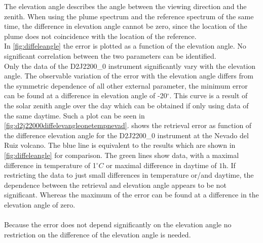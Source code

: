The elevation angle describes the angle between the viewing direction and the zenith. When using the plume spectrum and the reference spectrum of the same time, the difference in elevation angle cannot be zero, since the location of the plume does not coincidence with the location of the reference.\\
In \cref{fig:diffeleangle} the  error is plotted as a function of the elevation angle. No significant correlation between the two parameters can be identified. \\
Only the data of the D2J2200\_0 instrument significantly vary with the elevation angle. The observable variation of the  error with the elevation angle differs from the symmetric dependence of all other external parameter, the minimum  error can be found at a difference in elevation angle of -20$^{\circ}$. This curve is a result of the solar zenith angle over the day which can be obtained if only using data of the same daytime. Such a plot can be seen in \cref{fig:d2j22000diffelevangleonetempnevad}.
 shows the  retrieval error as function of the difference elevation angle for the D2J2200\_0 instrument at the Nevado del Ruiz volcano. The blue line is equivalent to the results which are shown in \cref{fig:diffeleangle} for comparison. The green lines show data, with a maximal difference in temperature of 1$^{\circ}C$ or maximal difference in daytime of $1$h. If restricting the data to just small differences in temperature or/and daytime, the dependence between the  retrieval and elevation angle appears to be not significant. Whereas the maximum of the  error can be found at a difference in the elevation angle of zero.\\
\\    
Because the  error does not depend significantly on the elevation angle no restriction on the difference of the elevation angle is needed.
